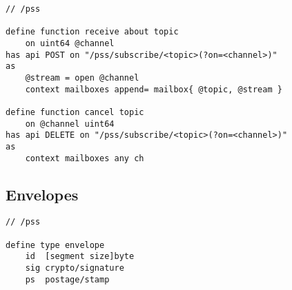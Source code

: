 \begin{definition}\label{def:receive}
\begin{lstlisting}[language=buzz1]
// /pss

define function receive about topic 
    on uint64 @channel
has api POST on "/pss/subscribe/<topic>(?on=<channel>)"
as 
    @stream = open @channel
    context mailboxes append= mailbox{ @topic, @stream }
    
define function cancel topic
    on @channel uint64
has api DELETE on "/pss/subscribe/<topic>(?on=<channel>)"
as
    context mailboxes any ch
\end{lstlisting}
\end{definition}

\subsection{Envelopes}

\begin{definition}[Envelope]\label{def:pss-envelope}
\begin{lstlisting}[language=buzz1]
// /pss

define type envelope
    id  [segment size]byte
    sig crypto/signature
    ps  postage/stamp   
    
\end{lstlisting}
\end{definition}
